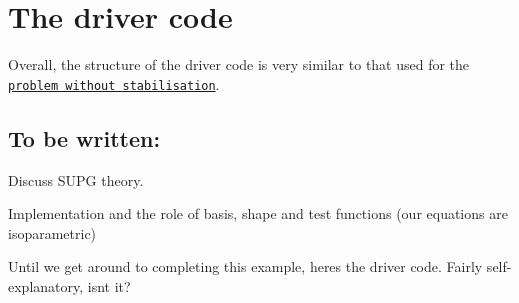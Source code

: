  

\hypertarget{index_main}{}\section{The driver code}\label{index_main}
Overall, the structure of the driver code is very similar to that used for the \href{../../../advection_diffusion/two_d_adv_diff_adapt/html/index.html}{\tt problem without stabilisation}.\hypertarget{index_todo}{}\subsection{To be written\+:}\label{index_todo}

\begin{DoxyItemize}
\item Discuss S\+U\+PG theory.
\item Implementation and the role of basis, shape and test functions (our equations are isoparametric)
\end{DoxyItemize}Until we get around to completing this example, here\textquotesingle{}s the driver code. Fairly self-\/explanatory, isn\textquotesingle{}t it?



